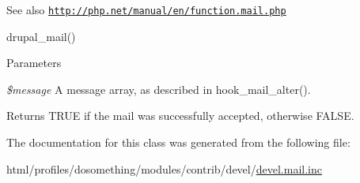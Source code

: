 \begin{DoxySeeAlso}{See also}
\href{http://php.net/manual/en/function.mail.php}{\tt http://php.net/manual/en/function.mail.php} 

drupal\_\-mail()
\end{DoxySeeAlso}

\begin{DoxyParams}{Parameters}
\item[{\em \$message}]A message array, as described in hook\_\-mail\_\-alter(). \end{DoxyParams}
\begin{DoxyReturn}{Returns}
TRUE if the mail was successfully accepted, otherwise FALSE. 
\end{DoxyReturn}


The documentation for this class was generated from the following file:\begin{DoxyCompactItemize}
\item 
html/profiles/dosomething/modules/contrib/devel/\hyperlink{devel_8mail_8inc}{devel.mail.inc}\end{DoxyCompactItemize}
